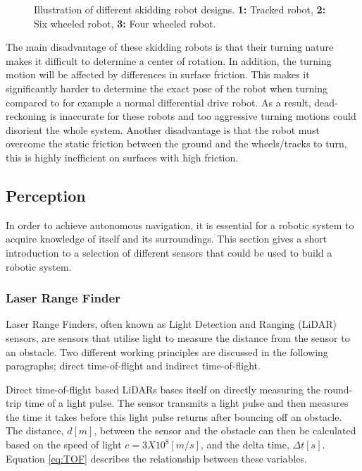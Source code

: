 \begin{figure}[htp]
  \centering
  
  \caption{Illustration of different skidding robot designs. \textbf{1:} Tracked robot, \textbf{2:} Six wheeled robot, \textbf{3:} Four wheeled robot.}
  \label{fig:skidDrive}
\end{figure}
The main disadvantage of these skidding robots is that their turning nature makes it difficult to determine a center of rotation. In addition, the turning motion will be affected by differences in surface friction. This makes it significantly harder to determine the exact pose of the robot when turning compared to for example a normal differential drive robot. As a result, dead-reckoning is inaccurate for these robots and too aggressive turning motions could disorient the whole system. Another disadvantage is that the robot must overcome the static friction between the ground and the wheels/tracks to turn, this is highly inefficient on surfaces with high friction.


\subsection{Perception}\label{sec:T:AN:Perception}
In order to achieve autonomous navigation, it is essential for a robotic system to acquire knowledge of itself and its surroundings. This section gives a short introduction to a selection of different sensors that could be used to build a robotic system.

\subsubsection{Laser Range Finder}
Laser Range Finders, often known as Light Detection and Ranging (LiDAR) sensors, are sensors that utilise light to measure the distance from the sensor to an obstacle. Two different working principles are discussed in the following paragraphs; direct time-of-flight and indirect time-of-flight.

Direct time-of-flight based LiDARs bases itself on directly measuring the round-trip time of a light pulse. The sensor transmits a light pulse and then measures the time it takes before this light pulse returns after bouncing off an obstacle. The distance, $d[m]$, between the sensor and the obstacle can then be calculated based on the speed of light $c=3X10^8[m/s]$, and the delta time, $\Delta t[s]$. Equation \ref{eq:TOF} describes the relationship between these variables.

